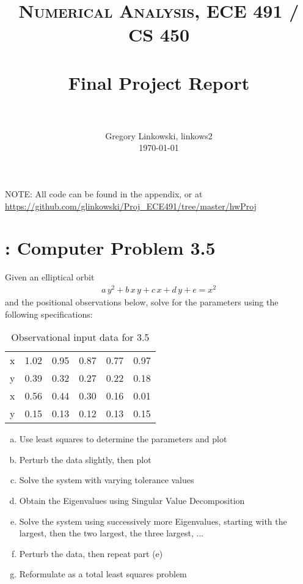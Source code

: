 \documentclass[paper=a4, fontsize=11pt]{scrartcl}
\title{
		\usefont{OT1}{bch}{b}{n}
		\normalfont \normalsize \textsc{Numerical Analysis, ECE 491 / CS 450} \\ [25pt]
		\horrule{0.5pt} \\[0.4cm]
		\huge Final Project Report \\
		\horrule{2pt} \\[0.5cm]
}
\author{
		\normalfont 								\normalsize
        Gregory Linkowski, linkows2\\[-3pt]		\normalsize
        \today
}
\date{}
\numberwithin{equation}{section}		%
\numberwithin{figure}{section}			%
\numberwithin{table}{section}				%
\begin{document}
\maketitle

NOTE: All code can be found in the appendix, or at \\ \url{https://github.com/glinkowski/Proj_ECE491/tree/master/hwProj}

\section{: Computer Problem 3.5}
Given an elliptical orbit
\begin{align}
	a \, y^2 + b \, x\, y + c\, x + d\, y + e = x^2
\end{align}
and the positional observations below, solve for the parameters using the following specifications:
\begin{table}[!hbt]
	\begin{center}
		\caption{Observational input data for 3.5}
		\label{tab:35input}
		\begin{tabular}{ c|c c c c c }
			x & 1.02 & 0.95 & 0.87 & 0.77 & 0.97 \\
			y & 0.39 & 0.32 & 0.27 & 0.22 & 0.18 \\
			\hline
			x & 0.56 & 0.44 & 0.30 & 0.16 & 0.01 \\
			y & 0.15 & 0.13 & 0.12 & 0.13 & 0.15 \\
		\end{tabular}
	\end{center}
\end{table}

\begin{enumerate}[(a)]
	\item Use least squares to determine the parameters and plot  \vspace{-2mm}
	\item Perturb the data slightly, then plot \vspace{-2mm}
	\item Solve the system with varying tolerance values \vspace{-2mm}
	\item Obtain the Eigenvalues using Singular Value Decomposition \vspace{-2mm}
	\item Solve the system using successively more Eigenvalues, starting with the largest, then the two largest, the three largest, ... \vspace{-2mm}
	\item Perturb the data, then repeat part (e) \vspace{-2mm}
	\item Reformulate as a total least squares problem \vspace{-2mm}
\end{enumerate}
\end{document}
